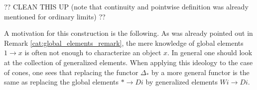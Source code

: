     ?? CLEAN THIS UP (note that continuity and pointwise definition was already mentioned for ordinary limits) ??


    \begin{remark}
        A motivation for this construction is the following. As was already pointed out in Remark \ref{cat:global_elements_remark}, the mere knowledge of global elements $1\rightarrow x$ is often not enough to characterize an object $x$. In general one should look at the collection of generalized elements. When applying this ideology to the case of cones, one sees that replacing the functor $\Delta_\ast$ by a more general functor is the same as replacing the global elements $\ast\rightarrow Di$ by generalized elements $Wi\rightarrow Di$.
    \end{remark}

